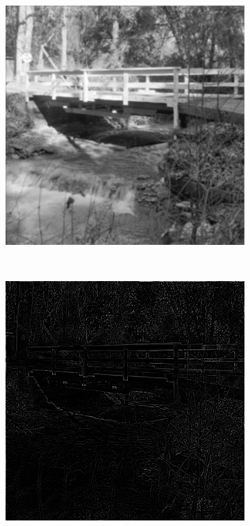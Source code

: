 \documentclass[
	article,			%
	11pt,				%
	oneside,			%
	a4paper,			%
	english,			%
	brazil,				%
	sumario=tradicional
	]{abntex2}
\begin{document}
\begin{figure}
\begin{subfigure}[b]{0.3\textwidth}
                \caption{}
                \label{fig:passaAlta}
        \end{subfigure}
 		~      
		\centering
        \begin{subfigure}[b]{0.3\textwidth}
                \includegraphics[width=\textwidth,scale=1]{imagens/ex2/filtradaPB.png}
                \caption{}
                \label{fig:passaBaixa} 
        \end{subfigure}%
        ~ %
        \begin{subfigure}[b]{0.3\textwidth}
                \includegraphics[width=\textwidth,scale=1]{imagens/ex2/filtradaPA.png}

\end{subfigure}
\end{figure}
\end{document}
